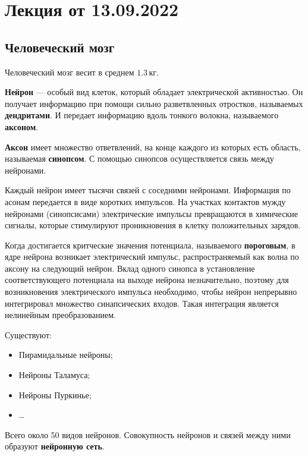
\section{Лекция от 13.09.2022}
\subsection{Человеческий мозг}
Человеческий мозг весит в среднем $1.3\,кг$.\par
\textbf{Нейрон} --- особый вид клеток, который обладает электрической
активностью. Он получает информацию при помощи сильно разветвленных отростков,
называемых \textbf{дендритами}. И передает информацию вдоль тонкого волокна,
называемого \textbf{аксоном}.\par
\textbf{Аксон} имеет множество ответвлений, на конце каждого из которых есть область,
называемая \textbf{синопсом}. С помощью синопсов осуществляется связь между
нейронами.\par
Каждый нейрон имеет тысячи связей с соседними нейронами. Информация по асонам
передается в виде коротких импульсов. На участках контактов мужду нейронами
(синопсисами) электрические импульсы превращаются в химические сигналы, которые
стимулируют проникновения в клетку положительных зарядов.\par
Когда достигается критческие значения потенциала, называемого \textbf{пороговым},
в ядре нейрона возникает электрический импульс, распространяемый как волна по
аксону на следующий нейрон. Вклад одного синопса в установление соответствующего
потенциала на выходе нейрона незначительно, поэтому для возникновения
электрического импульса необходимо, чтобы нейрон непрерывно интегрировал
множество синапсических входов. Такая интеграция является нелинейным
преобразованием.\par
Существуют:
\begin{itemize}
  \item Пирамидальные нейроны;
  \item Нейроны Таламуса;
  \item Нейроны Пуркинье;
  \item \dots
\end{itemize}
Всего около 50 видов нейронов. Совокупность нейронов и связей между ними
образуют \textbf{нейронную сеть}.

